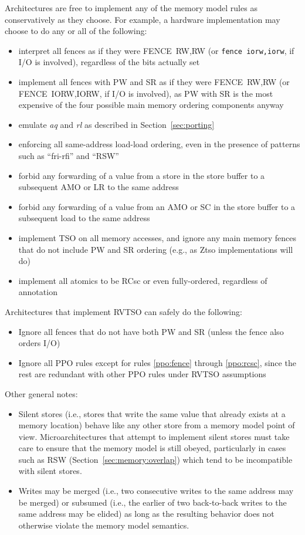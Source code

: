 Architectures are free to implement any of the memory model rules as conservatively as they choose.  For example, a hardware implementation may choose to do any or all of the following:
  \begin{itemize}
    \item interpret all fences as if they were FENCE~RW,RW (or {\tt fence iorw,iorw}, if I/O is involved), regardless of the bits actually set
    \item implement all fences with PW and SR as if they were FENCE~RW,RW (or FENCE~IORW,IORW, if I/O is involved), as PW with SR is the most expensive of the four possible main memory ordering components anyway
    \item emulate {\em aq} and {\em rl} as described in Section~\ref{sec:porting}
    \item enforcing all same-address load-load ordering, even in the presence of patterns such as ``fri-rfi'' and ``RSW''
    \item forbid any forwarding of a value from a store in the store buffer to a subsequent AMO or LR to the same address
    \item forbid any forwarding of a value from an AMO or SC in the store buffer to a subsequent load to the same address
    \item implement TSO on all memory accesses, and ignore any main memory fences that do not include PW and SR ordering (e.g., as Ztso implementations will do)
    \item implement all atomics to be RCsc or even fully-ordered, regardless of annotation
  \end{itemize}

Architectures that implement RVTSO can safely do the following:
\begin{itemize}
  \item Ignore all fences that do not have both PW and SR (unless the fence also orders I/O)
  \item Ignore all PPO rules except for rules \ref{ppo:fence} through \ref{ppo:rcsc}, since the rest are redundant with other PPO rules under RVTSO assumptions
\end{itemize}

Other general notes:

\begin{itemize}
  \item Silent stores (i.e., stores that write the same value that already exists at a memory location) behave like any other store from a memory model point of view.  Microarchitectures that attempt to implement silent stores must take care to ensure that the memory model is still obeyed, particularly in cases such as RSW (Section~\ref{sec:memory:overlap}) which tend to be incompatible with silent stores.
  \item Writes may be merged (i.e., two consecutive writes to the same address may be merged) or subsumed (i.e., the earlier of two back-to-back writes to the same address may be elided) as long as the resulting behavior does not otherwise violate the memory model semantics.
\end{itemize}


